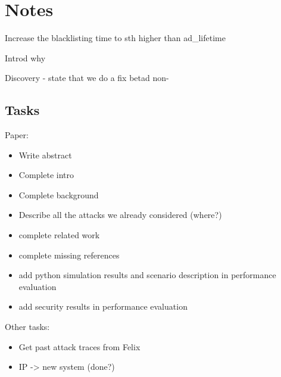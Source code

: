 
\section{Notes}
Increase the blacklisting time to sth higher than ad\_lifetime

Introd why


Discovery - state that we do a fix betad non-



\subsection{Tasks}
Paper: 

\begin{itemize}
	\item Write abstract
    \item Complete intro
    \item Complete background
    \item Describe all the attacks we already considered (where?)
    \item complete related work
    \item complete missing references
    \item add python simulation results and scenario description in performance evaluation
    \item add security results  in performance evaluation
\end{itemize}

Other tasks:

\begin{itemize}
	\item Get past attack traces from Felix
    \item IP -> new system (done?)
\end{itemize}